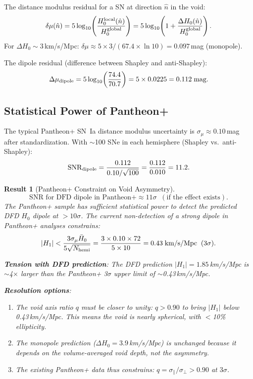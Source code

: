 \documentclass[aps,prd,twocolumn,superscriptaddress]{revtex4-2}
\newtheorem{result}{Result}
\begin{document}
The distance modulus residual for a SN at direction $\hat{n}$
in the void:
\begin{equation}
\delta\mu(\hat{n}) = 5\log_{10}\!\left(\frac{H_0^{\rm local}(\hat{n})}
{H_0^{\rm global}}\right)
= 5\log_{10}\!\left(1 + \frac{\Delta H_0(\hat{n})}{H_0^{\rm global}}\right).
\end{equation}
For $\Delta H_0 \sim 3$\,km/s/Mpc: $\delta\mu \approx 5\times3/(67.4\times\ln10)
= 0.097$\,mag (monopole).

The dipole residual (difference between Shapley and anti-Shapley):
\begin{equation}
\Delta\mu_{\rm dipole} = 5\log_{10}\!\left(\frac{74.4}{70.7}\right)
= 5\times0.0225 = 0.112\;\text{mag}.
\end{equation}

\subsection{Statistical Power of Pantheon+}

The typical Pantheon+ SN~Ia distance modulus uncertainty is
$\sigma_\mu \approx 0.10$\,mag after standardization. With
$\sim$100 SNe in each hemisphere (Shapley vs.\ anti-Shapley):
\begin{equation}
\text{SNR}_{\rm dipole} = \frac{0.112}{0.10/\sqrt{100}}
= \frac{0.112}{0.010} = 11.2.
\end{equation}

\begin{result}[Pantheon+ Constraint on Void Asymmetry]
\label{res:Pantheon}
\begin{equation}
\boxed{
\text{SNR for DFD dipole in Pantheon+} \approx 11\sigma
\;\;(\text{if the effect exists}).
}
\end{equation}
The Pantheon+ sample has sufficient statistical power to detect
the predicted DFD $H_0$ dipole at $>10\sigma$. The current
non-detection of a strong dipole in Pantheon+ analyses constrains:
\begin{equation}
|H_1| < \frac{3\sigma_\mu\bar{H}_0}{5\sqrt{N_{\rm hemi}}}
= \frac{3\times0.10\times72}{5\times10}
= 0.43\;\text{km/s/Mpc}\;\;(3\sigma).
\end{equation}

\textbf{Tension with DFD prediction}: The DFD prediction
$|H_1| = 1.85$\,km/s/Mpc is $\sim$4$\times$ larger than the
Pantheon+ 3$\sigma$ upper limit of $\sim$0.43\,km/s/Mpc.

\textbf{Resolution options}:
\begin{enumerate}
\item The void axis ratio $q$ must be closer to unity:
$q > 0.90$ to bring $|H_1|$ below 0.43\,km/s/Mpc.  This means
the void is nearly spherical, with $<$10\% ellipticity.
\item The monopole prediction ($\Delta H_0 = 3.9$\,km/s/Mpc)
is unchanged because it depends on the volume-averaged void depth,
not the asymmetry.
\item The existing Pantheon+ data thus constrains:
$q = \sigma_\parallel/\sigma_\perp > 0.90$ at $3\sigma$.
\end{enumerate}
\end{result}
\end{document}

